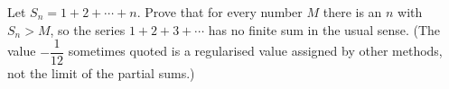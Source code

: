 Let $S_n=1+2+\cdots+n$. Prove that for every number $M$ there is an $n$ with $S_n>M$, so the series $1+2+3+\cdots$ has no finite sum in the usual sense. (The value $-\dfrac1{12}$ sometimes quoted is a regularised value assigned by other methods, not the limit of the partial sums.)
